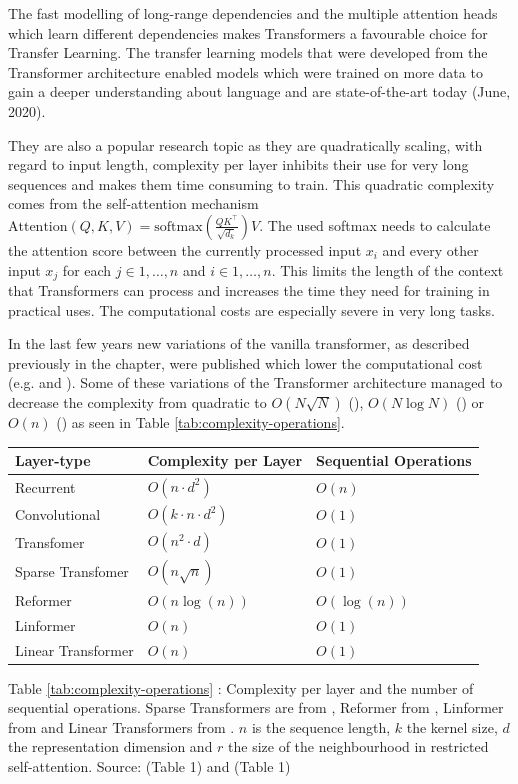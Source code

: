\documentclass[]{krantz}
\begin{document}
The fast modelling of long-range dependencies and the multiple attention heads which learn different
dependencies makes Transformers a favourable choice for Transfer Learning.
The transfer learning models that were developed from the Transformer architecture
enabled models which were trained on more data to gain a deeper understanding about
language and are state-of-the-art today (June, 2020).

They are also a popular research topic as they are quadratically scaling, with regard to input length, complexity per layer
inhibits their use for very long sequences and makes them time consuming to train.
This quadratic complexity comes from the self-attention mechanism \(\text{Attention}(Q,K,V) = \text{softmax}(\frac{QK^\top}{\sqrt{d_k}})V\).
The used softmax needs to calculate the attention score between the currently processed input \(x_i\) and every
other input \(x_j\) for each \(j \in {1, \dots ,n}\) and \(i \in {1, \dots ,n}\). This limits the length of the
context that Transformers can process and increases the time they need for training in practical uses.
The computational costs are especially severe in very long tasks.

In the last few years new variations of the vanilla transformer, as described previously in the chapter, were published
which lower the computational cost (e.g. \citet{shen2018efficient} and \citet{choromanski2020masked}).
Some of these variations of the Transformer architecture managed to decrease the complexity
from quadratic to \(O(N\sqrt{N})\) (\citet{child2019generating}), \(O(N\log N)\) (\citet{kitaev2020reformer}) or \(O(n)\) (\citet{wang2020linformer}) as seen in Table \ref{tab:complexity-operations}.

\begin{longtable}[]{@{}lll@{}}
\toprule
Layer-type & Complexity per Layer & Sequential Operations\tabularnewline
\midrule
\endhead
Recurrent & \(O(n \cdot d^2)\) & \(O(n)\)\tabularnewline
Convolutional & \(O(k \cdot n \cdot d^2)\) & \(O(1)\)\tabularnewline
Transfomer & \(O(n^2 \cdot d)\) & \(O(1)\)\tabularnewline
Sparse Transfomer & \(O(n\sqrt{n})\) & \(O(1)\)\tabularnewline
Reformer & \(O(n \log (n))\) & \(O(\log (n))\)\tabularnewline
Linformer & \(O(n)\) & \(O(1)\)\tabularnewline
Linear Transformer & \(O(n)\) & \(O(1)\)\tabularnewline
\bottomrule
\end{longtable}

Table \ref{tab:complexity-operations} : \label{tab:complexity-operations} Complexity per layer and the number of sequential operations. Sparse Transformers are from \citet{child2019generating}, Reformer from \citet{kitaev2020reformer}, Linformer from \citet{wang2020linformer} and Linear Transformers from \citet{katharopoulos2020transformers}. \(n\) is the sequence length, \(k\) the kernel size, \(d\) the representation dimension and \(r\) the size of the neighbourhood in restricted self-attention. Source: \citet{vaswani2017attention} (Table 1) and \citet{wang2020linformer} (Table 1)
\end{document}
